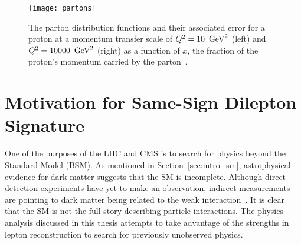 \begin{figure}[tbhp]
\centering
\texttt{[image: partons]}
\caption[Parton distribution functions for protons at $Q^2=10~\GeV^2$ and $Q^2=10000~\GeV^2$] 
{\label{fig:intro_partons}
The parton distribution functions and their associated error
for a proton at a momentum transfer scale of $Q^2=10~\GeV^2$ (left) and
$Q^2=10000~\GeV^2$ (right) as a function of $x$, the fraction of the proton's
momentum carried by the parton~\cite{partons}.
}
\end{figure}

\section{Motivation for Same-Sign Dilepton Signature}
\label {sec:intro_ss}
One of the purposes of the LHC and CMS is to search for physics beyond
the Standard Model (BSM). As mentioned in Section~\ref{sec:intro_sm},
astrophysical evidence for dark matter suggests that the SM is incomplete.
Although direct detection experiments have yet to make an observation,
indirect measurements are pointing to dark matter being related to the weak
interaction~\cite{darkmatter,baer}. It is clear that the SM is not the full
story describing particle interactions. The physics analysis discussed in this
thesis attempts to take advantage of the strengths in lepton reconstruction
to search for previously unobserved physics.

